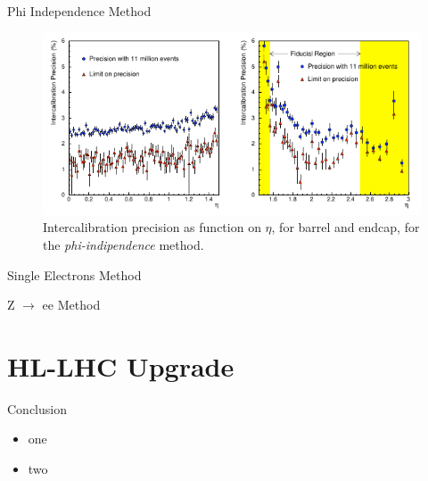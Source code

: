 \documentclass[10pt]{beamer}
\begin{document}
\begin{frame}{Phi Independence Method}
    \begin{figure}
        \centering
        \includegraphics[width=\textwidth]{./img/intercalib_phi.png}
        \caption{Intercalibration precision as function on $\eta$, for barrel and endcap, for the \emph{phi-indipendence} method.}
        \label{fig:intercalib_phi}
    \end{figure}
\end{frame}

\begin{frame}{Single Electrons Method}
    
\end{frame}

\begin{frame}{Z $\rightarrow$ ee Method}
    
\end{frame}

\section{HL-LHC Upgrade}


\begin{frame}{Conclusion}
    \begin{itemize}
        \item one
        \item two
    \end{itemize}
\end{frame}
 
\end{document}
